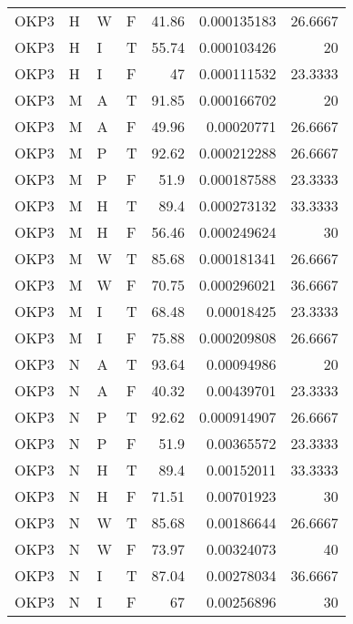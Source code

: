 \begin{table}[!htb]
{\begin{tabular}{llllrrr}
            OKP3     & H     & W     & F          & 41.86      & 0.000135183 & 26.6667  \\
            OKP3     & H     & I     & T          & 55.74      & 0.000103426 & 20       \\
            OKP3     & H     & I     & F          & 47         & 0.000111532 & 23.3333  \\
            OKP3     & M     & A     & T          & 91.85      & 0.000166702 & 20       \\
            OKP3     & M     & A     & F          & 49.96      & 0.00020771  & 26.6667  \\
            OKP3     & M     & P     & T          & 92.62      & 0.000212288 & 26.6667  \\
            OKP3     & M     & P     & F          & 51.9       & 0.000187588 & 23.3333  \\
            OKP3     & M     & H     & T          & 89.4       & 0.000273132 & 33.3333  \\
            OKP3     & M     & H     & F          & 56.46      & 0.000249624 & 30       \\
            OKP3     & M     & W     & T          & 85.68      & 0.000181341 & 26.6667  \\
            OKP3     & M     & W     & F          & 70.75      & 0.000296021 & 36.6667  \\
            OKP3     & M     & I     & T          & 68.48      & 0.00018425  & 23.3333  \\
            OKP3     & M     & I     & F          & 75.88      & 0.000209808 & 26.6667  \\
            OKP3     & N     & A     & T          & 93.64      & 0.00094986  & 20       \\
            OKP3     & N     & A     & F          & 40.32      & 0.00439701  & 23.3333  \\
            OKP3     & N     & P     & T          & 92.62      & 0.000914907 & 26.6667  \\
            OKP3     & N     & P     & F          & 51.9       & 0.00365572  & 23.3333  \\
            OKP3     & N     & H     & T          & 89.4       & 0.00152011  & 33.3333  \\
            OKP3     & N     & H     & F          & 71.51      & 0.00701923  & 30       \\
            OKP3     & N     & W     & T          & 85.68      & 0.00186644  & 26.6667  \\
            OKP3     & N     & W     & F          & 73.97      & 0.00324073  & 40       \\
            OKP3     & N     & I     & T          & 87.04      & 0.00278034  & 36.6667  \\
            OKP3     & N     & I     & F          & 67         & 0.00256896  & 30       \\
            \hline
        \end{tabular}
    }{}
\end{table}